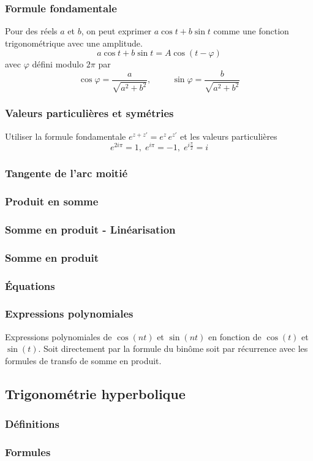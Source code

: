 \subsubsection{Formule fondamentale}
Pour des réels $a$ et $b$, on peut exprimer $a\cos t + b\sin t$ comme une fonction trigonométrique avec une amplitude.
\begin{displaymath}
 a\cos t + b\sin t = A \cos(t-\varphi)
 \end{displaymath}
avec $\varphi$ défini modulo $2\pi$ par 
\begin{displaymath}
 \cos \varphi = \frac{a}{\sqrt{a^2 + b^2}}, \hspace{1cm} \sin \varphi = \frac{b}{\sqrt{a^2 + b^2}}
\end{displaymath}


\subsubsection{Valeurs particulières et symétries}
Utiliser la formule fondamentale $e^{z+z'} = e^{z}\, e^{z'}$ et les valeurs particulières
\begin{displaymath}
  e^{2i\pi} = 1, \; e^{i\pi} = -1, \; e^{i\frac{\pi}{2}} = i
\end{displaymath}

\subsubsection{Tangente de l'arc moitié}
\subsubsection{Produit en somme}
\subsubsection{Somme en produit - Linéarisation}
\subsubsection{Somme en produit}
\subsubsection{\'Equations}
\subsubsection{Expressions polynomiales}
Expressions polynomiales de $\cos(nt)$ et $\sin(nt)$ en fonction de $\cos(t)$ et $\sin(t)$. Soit directement par la formule du binôme soit par  récurrence avec les formules de transfo de somme en produit.

\subsection{Trigonométrie hyperbolique}
\subsubsection{Définitions}
\subsubsection{Formules}

